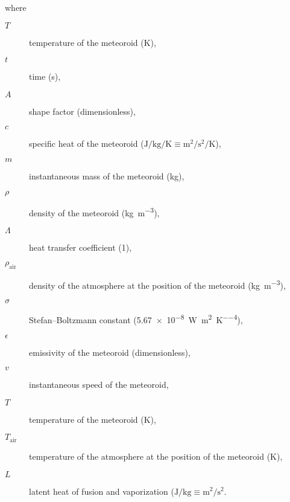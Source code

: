         where
        \begin{description}
            \item[$T$]
                temperature of the meteoroid ($\mathrm{K}$),
            \item[$t$]
                time (\si{\second}),
            \item[$A$]
                shape factor (dimensionless),
            \item[$c$]
                specific heat of the meteoroid ($\si{\joule\per\kilo\gram\per\kelvin} \equiv \si{\metre\squared\per\second\squared\per\kelvin}$),
            \item[$m$]
                instantaneous mass of the meteoroid (\si{\kilo\gram}),
            \item[$\rho$]
                density of the meteoroid (\si{\kilo\gram\per\metre\cubed}),
            \item[$\Lambda$]
                heat transfer coefficient (\si{1}),
            \item[$\rho_\mathrm{air}$]
                density of the atmosphere at the position of the meteoroid (\si{\kilo\gram\per\metre\cubed}),
            \item[$\sigma$]
                Stefan--Boltzmann constant (\SI{5.67e-8}{\watt\per\metre\squared\per\kelvin\tothe{4}}),
            \item[$\epsilon$]
                emissivity of the meteoroid (dimensionless),
            \item[$v$]
                instantaneous speed of the meteoroid,
            \item[$T$]
                temperature of the meteoroid (\si{\kelvin}),
            \item[$T_\mathrm{air}$]
                temperature of the atmosphere at the position of the meteoroid (\si{\kelvin}),
            \item[$L$]
                latent heat of fusion and vaporization ($\si{\joule\per\kilo\gram} \equiv \si{\metre\squared\per\second\squared}$.

        \end{description}

